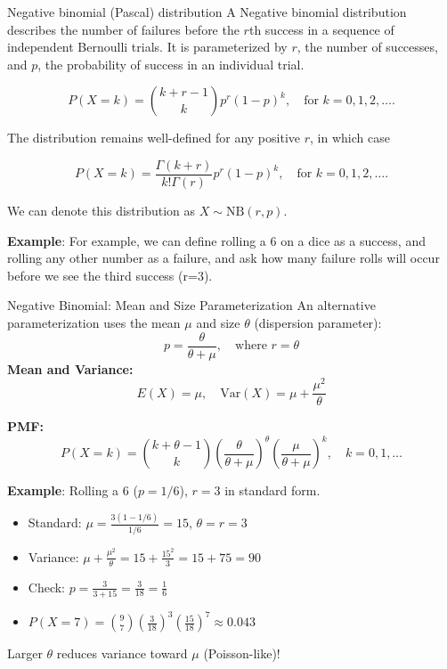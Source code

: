 \documentclass[10pt,ignorenonframetext,aspectratio=169]{beamer}
\begin{document}


\begin{frame}{Negative binomial (Pascal) distribution}
    A Negative binomial distribution describes the number of failures before the $r$th success in a sequence of independent Bernoulli trials. It is parameterized by $r$, the number of successes, and $p$, the probability of success in an individual trial.
    
    \begin{equation}
        P(X = k) = {k + r - 1 \choose k} p^r (1 - p)^k, \quad \text{for } k = 0,1,2,\ldots.
\end{equation}
    
    The distribution remains well-defined for any positive $r$, in which case
     
\begin{equation}
        P(X = k) = \frac{\Gamma(k+r)}{k! \Gamma(r)} p^r (1 - p)^k, \quad \text{for } k = 0,1,2,\ldots.
\end{equation}


We can denote this distribution as $X \sim \mathrm{NB}(r,p)$.

\vspace{0.5cm}

\textbf{Example}: For example, we can define rolling a 6 on a dice as a success, and rolling any other number as a failure, and ask how many failure rolls will occur before we see the third success (r=3).
\end{frame}

\begin{frame}{Negative Binomial: Mean and Size Parameterization}
    An alternative parameterization uses the mean $\mu$ and size $\theta$ (dispersion parameter):
    \[
    p = \frac{\theta}{\theta + \mu}, \quad \text{where } r = \theta
    \]
    \textbf{Mean and Variance:}
    \[
    E(X) = \mu, \quad \text{Var}(X) = \mu + \frac{\mu^2}{\theta}
    \]

    \textbf{PMF:}
    \[
    P(X = k) = \binom{k + \theta - 1}{k} \left(\frac{\theta}{\theta + \mu}\right)^\theta \left(\frac{\mu}{\theta + \mu}\right)^k, \quad k = 0, 1, \ldots
    \]

    \vspace{0.3cm}

    \textbf{Example}: Rolling a 6 ($p = 1/6$), $r = 3$ in standard form.
    \begin{itemize}
    \scriptsize
        \item Standard: $\mu = \frac{3 (1 - 1/6)}{1/6} = 15$, $\theta = r = 3$
        \item Variance: $\mu + \frac{\mu^2}{\theta} = 15 + \frac{15^2}{3} = 15 + 75 = 90$
        \item Check: $p = \frac{3}{3 + 15} = \frac{3}{18} = \frac{1}{6}$
        \item $P(X = 7) = \binom{9}{7} \left(\frac{3}{18}\right)^3 \left(\frac{15}{18}\right)^7 \approx 0.043$
    \end{itemize}

    Larger $\theta$ reduces variance toward $\mu$ (Poisson-like)!
\end{frame}
\end{document}
